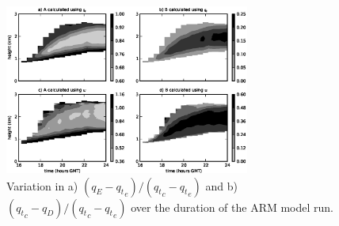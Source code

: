 \documentclass[12pt]{article}
\begin{document}
\begin{figure}[t]
  \noindent\includegraphics[width=19pc]{./figures/shell_variability}
  \caption{Variation in a) $(q_E - {q_t}_e)/({q_t}_c - {q_t}_e)$ and b)
  $({q_t}_c - q_D)/({q_t}_c - {q_t}_e)$ over the duration of the ARM model run.
  }
  \label{fig:shell_variability}
\end{figure}
\end{document}
